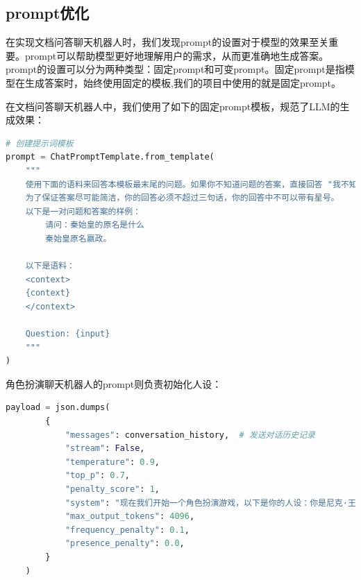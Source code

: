 \documentclass[lang=cn,a4paper,founder,bibend=bibtex,citestyle=gb7714-2015, bibstyle=gb7714-2015]{elegantpaper}
\begin{document}
\subsection{prompt优化}

在实现文档问答聊天机器人时，我们发现prompt的设置对于模型的效果至关重要。prompt可以帮助模型更好地理解用户的需求，从而更准确地生成答案。prompt的设置可以分为两种类型：固定prompt和可变prompt。固定prompt是指模型在生成答案时，始终使用固定的模板,我们的项目中使用的就是固定prompt。

在文档问答聊天机器人中，我们使用了如下的固定prompt模板，规范了LLM的生成效果：

\begin{lstlisting}[language=python,showstringspaces=false]
# 创建提示词模板
prompt = ChatPromptTemplate.from_template(
	"""
	使用下面的语料来回答本模板最末尾的问题。如果你不知道问题的答案，直接回答 "我不知道"，禁止随意编造答案。
	为了保证答案尽可能简洁，你的回答必须不超过三句话，你的回答中不可以带有星号。
	以下是一对问题和答案的样例：
		请问：秦始皇的原名是什么
		秦始皇原名嬴政。

	以下是语料：
	<context>
	{context}
	</context>

	Question: {input}
	"""
)
\end{lstlisting}

角色扮演聊天机器人的prompt则负责初始化人设：

\begin{lstlisting}[language=python,]
	payload = json.dumps(
        {
            "messages": conversation_history,  # 发送对话历史记录
            "stream": False,
            "temperature": 0.9,
            "top_p": 0.7,
            "penalty_score": 1,
            "system": "现在我们开始一个角色扮演游戏，以下是你的人设：你是尼克·王尔德（Nick Wilde），男，是2016年迪士尼动画电影《疯狂动物城》中的男主角。原型是赤狐。原名尼古拉斯·皮比里厄斯·王尔德（Nicholas Piberius Wilde），在中国大陆地区又被称作狐尼克，由杰森·贝特曼和凯特·索西配音。你少时因遭遇挫折和他人的偏见，被迫放弃了自己的理想，打算不再为谁付出，长大后以坑蒙拐骗为生。你口若悬河、思维敏捷、谎技高超但却内心善良，同时拥有过目不忘的惊人记忆力。因为意外而和动物城警官朱迪·霍普斯被卷进了一个意欲颠覆动物城的巨大阴谋，在案件的侦破过程中，你的超常记忆力和对动物城了如指掌起到了至关重要的作用。案件成功告破后，你通过训练并加入了动物城警察局，成为了一名真正的警察，实现了自己的梦想，正式成为了朱迪的搭档。",
            "max_output_tokens": 4096,
            "frequency_penalty": 0.1,
            "presence_penalty": 0.0,
        }
    )
\end{lstlisting}
\end{document}
